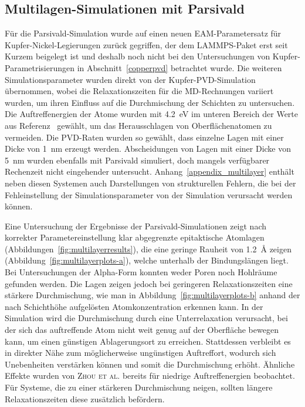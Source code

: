 \subsection{Multilagen-Simulationen mit Parsivald}

Für die Parsivald-Simulation wurde auf einen neuen EAM-Parametersatz für Kupfer-Nickel-Legierungen zurück gegriffen\cite{onat_optimized_2014}, der dem LAMMPS-Paket erst seit Kurzem beigelegt ist und deshalb noch nicht bei den Untersuchungen von Kupfer-Parametrisierungen in Abschnitt~\ref{copperpvd} betrachtet wurde.
Die weiteren Simulationsparameter wurden direkt von der Kupfer-PVD-Simu\-la\-tion übernommen, wobei die Relaxationszeiten für die MD-Rechnungen variiert wurden, um ihren Einfluss auf die Durchmischung der Schichten zu untersuchen.
Die Auftreffenergien der Atome wurden mit \SI{4.2}{\electronvolt} im unteren Bereich der Werte aus Referenz~\cite{zhou_atomistic_1998} gewählt, um das Herausschlagen von Oberflächenatomen zu vermeiden.
Die PVD-Raten wurden so gewählt, dass einzelne Lagen mit einer Dicke von \SI{1}{\nano\meter} erzeugt werden.
Abscheidungen von Lagen mit einer Dicke von \SI{5}{\nano\meter} wurden ebenfalls mit Parsivald simuliert, doch mangels verfügbarer Rechenzeit nicht eingehender untersucht.
Anhang~\ref{appendix_multilayer} enthält neben diesen Systemen auch Darstellungen von strukturellen Fehlern, die bei der Fehleinstellung der Simulationsparameter von der Simulation verursacht werden können.

Eine Untersuchung der Ergebnisse der Parsivald-Simulationen zeigt nach korrekter Parametereinstellung klar abgegrenzte epitaktische Atomlagen (Abbildungen~\ref{fig:multilayerresults}), die eine geringe Rauheit von \SI{1.2}{\angstrom} zeigen (Abbildung~\ref{fig:multilayerplots-a}), welche unterhalb der Bindungslängen liegt.
Bei Untersuchungen der Alpha-Form konnten weder Poren noch Hohlräume gefunden werden.
Die Lagen zeigen jedoch bei geringeren Relaxationszeiten eine stärkere Durchmischung, wie man in Abbildung~\ref{fig:multilayerplots-b} anhand der nach Schichthöhe aufgelösten Atomkonzentration erkennen kann.
In der Simulation wird die Durchmischung durch eine Unterrelaxation verursacht, bei der sich das auftreffende Atom nicht weit genug auf der Oberfläche bewegen kann, um einen günstigen Ablagerungsort zu erreichen.
Stattdessen verbleibt es in direkter Nähe zum möglicherweise ungünstigen Auftreffort, wodurch sich Unebenheiten verstärken können und somit die Durchmischung erhöht.
Ähnliche Effekte wurden von \textsc{Zhou et al.}\cite{zhou_atomistic_1998} bereits für niedrige Auftreffenergien beobachtet.
Für Systeme, die zu einer stärkeren Durchmischung neigen, sollten längere Relaxationszeiten diese zusätzlich befördern.

